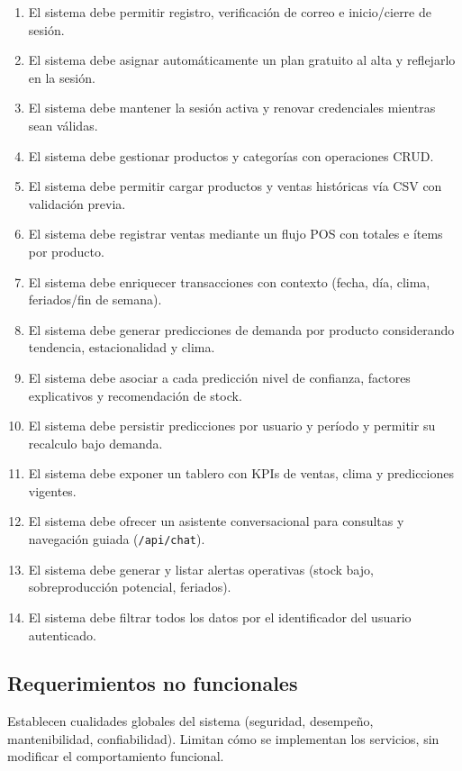 \begin{enumerate}[label=RF-\arabic*., leftmargin=*, nosep]
  \item El sistema debe permitir registro, verificación de correo e inicio/cierre de sesión.
  \item El sistema debe asignar automáticamente un plan gratuito al alta y reflejarlo en la sesión.
  \item El sistema debe mantener la sesión activa y renovar credenciales mientras sean válidas.
  \item El sistema debe gestionar productos y categorías con operaciones CRUD.
  \item El sistema debe permitir cargar productos y ventas históricas vía CSV con validación previa.
  \item El sistema debe registrar ventas mediante un flujo POS con totales e ítems por producto.
  \item El sistema debe enriquecer transacciones con contexto (fecha, día, clima, feriados/fin de semana).
  \item El sistema debe generar predicciones de demanda por producto considerando tendencia, estacionalidad y clima.
  \item El sistema debe asociar a cada predicción nivel de confianza, factores explicativos y recomendación de stock.
  \item El sistema debe persistir predicciones por usuario y período y permitir su recalculo bajo demanda.
  \item El sistema debe exponer un tablero con KPIs de ventas, clima y predicciones vigentes.
  \item El sistema debe ofrecer un asistente conversacional para consultas y navegación guiada (\texttt{/api/chat}).
  \item El sistema debe generar y listar alertas operativas (stock bajo, sobreproducción potencial, feriados).
  \item El sistema debe filtrar todos los datos por el identificador del usuario autenticado.
\end{enumerate}

\subsection{Requerimientos no funcionales}
Establecen cualidades globales del sistema (seguridad, desempeño, mantenibilidad, confiabilidad). Limitan cómo se implementan los servicios, sin modificar el comportamiento funcional.

